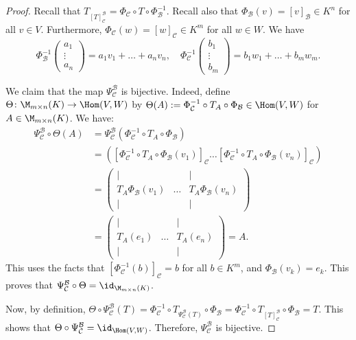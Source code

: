 \begin{proof}
  Recall that $T_{[T]_{\mathcal{C}}^{\mathcal{B}}} = \Phi_{\mathcal{C}} \circ T \circ \Phi_{\mathcal{B}}^{-1}$. Recall also that $\Phi_{\mathcal{B}}(v) = [v]_{\mathcal{B}} \in K^n$ for all $v \in V$. Furthermore, $\Phi_{\mathcal{C}}(w) = [w]_{\mathcal{C}} \in K^m$ for all $w \in W$. We have
  \[ \Phi_{\mathcal{B}}^{-1} \begin{pmatrix} a_1 \\ \vdots \\ a_n \end{pmatrix} = a_1 v_1 + \dots + a_n v_n, \quad \Phi_{\mathcal{C}}^{-1} \begin{pmatrix} b_1 \\ \vdots \\ b_m \end{pmatrix} = b_1 w_1 + \dots + b_m w_m. \]

  We claim that the map $\Psi_{\mathcal{C}}^{\mathcal{B}}$ is bijective. Indeed, define $\Theta \colon \M_{m \times n}(K) \to \Hom(V,W)$ by $\Theta(A) := \Phi_{\mathcal{C}}^{-1} \circ T_A \circ \Phi_{\mathcal{B}} \in \Hom(V,W)$ for $A \in \M_{m \times n}(K)$. We have:
  \begin{align*}
    \Psi_{\mathcal{C}}^{\mathcal{B}} \circ \Theta(A) &= \Psi_{\mathcal{C}}^{\mathcal{B}}(\Phi_{\mathcal{C}}^{-1} \circ T_A \circ \Phi_{\mathcal{B}}) \\
    &= \left( [\Phi_{\mathcal{C}}^{-1} \circ T_A \circ \Phi_{\mathcal{B}}(v_1)]_{\mathcal{C}} \dots [\Phi_{\mathcal{C}}^{-1} \circ T_A \circ \Phi_{\mathcal{B}}(v_n)]_{\mathcal{C}} \right) \\
    &= \begin{pmatrix} | & & | \\ T_A \Phi_{\mathcal{B}}(v_1) & \dots & T_A \Phi_{\mathcal{B}}(v_n) \\ | & & | \end{pmatrix} \\
    &= \begin{pmatrix} | & & | \\ T_A(e_1) & \dots & T_A(e_n) \\ | & & | \end{pmatrix} = A.
  \end{align*}
  This uses the facts that $[\Phi_{\mathcal{C}}^{-1}(b)]_{\mathcal{C}} = b$ for all $b \in K^m$, and $\Phi_{\mathcal{B}}(v_k) = e_k$. This proves that $\Psi_{\mathcal{C}}^{\mathcal{B}} \circ \Theta = \id_{\M_{m \times n}(K)}$.

  Now, by definition, $\Theta \circ \Psi_{\mathcal{C}}^{\mathcal{B}}(T) = \Phi_{\mathcal{C}}^{-1} \circ T_{\Psi_{\mathcal{C}}^{\mathcal{B}}(T)} \circ \Phi_{\mathcal{B}} = \Phi_{\mathcal{C}}^{-1} \circ T_{[T]_{\mathcal{C}}^{\mathcal{B}}} \circ \Phi_{\mathcal{B}} = T$. This shows that $\Theta \circ \Psi_{\mathcal{C}}^{\mathcal{B}} = \id_{\Hom(V,W)}$. Therefore, $\Psi_{\mathcal{C}}^{\mathcal{B}}$ is bijective.


\end{proof}
